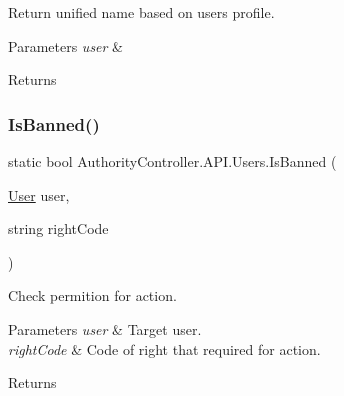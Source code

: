 Return unified name based on user\textquotesingle{}s profile. 


\begin{DoxyParams}{Parameters}
{\em user} & \\
\hline
\end{DoxyParams}
\begin{DoxyReturn}{Returns}

\end{DoxyReturn}
\mbox{\label{class_authority_controller_1_1_a_p_i_1_1_users_ab23c24d29e83e28d25452f7da05b427d}} 
\subsubsection{\texorpdfstring{Is\+Banned()}{IsBanned()}}
{\footnotesize\ttfamily static bool Authority\+Controller.\+A\+P\+I.\+Users.\+Is\+Banned (\begin{DoxyParamCaption}\item[{\mbox{\hyperlink{class_authority_controller_1_1_data_1_1_personal_1_1_user}{User}}}]{user,  }\item[{string}]{right\+Code }\end{DoxyParamCaption})\hspace{0.3cm}{\ttfamily [static]}}



Check permition for action. 


\begin{DoxyParams}{Parameters}
{\em user} & Target user.\\
\hline
{\em right\+Code} & Code of right that required for action.\\
\hline
\end{DoxyParams}
\begin{DoxyReturn}{Returns}

\end{DoxyReturn}
\mbox{\label{class_authority_controller_1_1_a_p_i_1_1_users_a5154a7787617e9c51c5519304ec89530}} 
